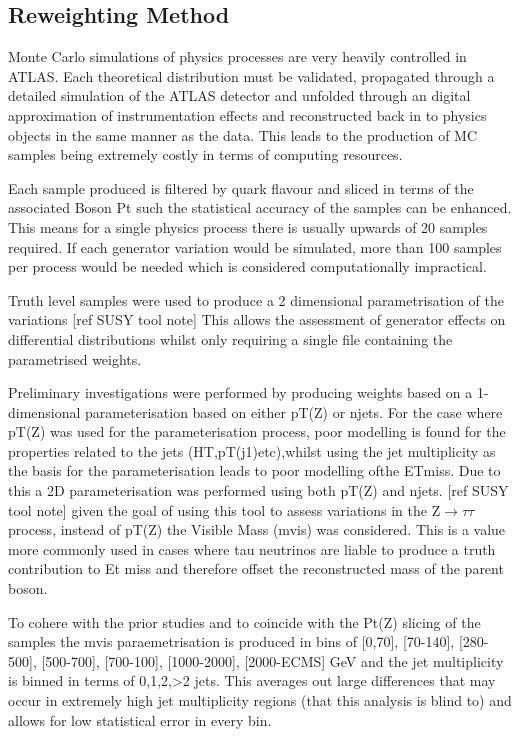 \subsection{Reweighting Method}

Monte Carlo simulations of physics processes are very heavily controlled in ATLAS. Each theoretical distribution must be validated, propagated through a detailed simulation of the ATLAS detector and unfolded through an digital approximation of instrumentation effects and reconstructed back in to physics objects in the same manner as the data. This leads to the production of MC samples being extremely costly in terms of computing resources.

Each sample produced is filtered by quark flavour and sliced in terms of the associated Boson Pt such the statistical accuracy of the samples can be enhanced. This means for a single physics process there is usually upwards of 20 samples required. If each generator variation would be simulated, more than 100 samples per process would be needed which is considered computationally impractical. 

Truth level samples were used to produce a 2 dimensional parametrisation of the variations [ref SUSY tool note] This allows the assessment of generator effects on differential distributions whilst only requiring a single file containing the parametrised weights. 

Preliminary investigations were performed by producing weights based on a 1-dimensional parameterisation  based  on  either pT(Z) or njets. For  the  case  where pT(Z)  was used  for  the  parameterisation process, poor modelling is found for the properties related to the jets (HT,pT(j1)etc),whilst using the jet multiplicity as the basis for the parameterisation leads to poor modelling ofthe ETmiss.  Due to this a 2D parameterisation was performed using both pT(Z) and njets. [ref SUSY tool note] given the goal of using this tool to assess variations in the Z$\rightarrow\tau\tau$ process, instead of pT(Z) the Visible Mass (mvis) was considered. This is a value more commonly used in cases where tau neutrinos are liable to produce a truth contribution to Et miss and therefore offset the reconstructed mass of the parent boson.

To cohere with the prior studies and to coincide with the Pt(Z) slicing of the samples the mvis paraemetrisation is produced in bins of [0,70], [70-140], [280-500], [500-700], [700-100], [1000-2000], [2000-ECMS] GeV and the jet multiplicity is binned in terms of 0,1,2,>2 jets. This averages out large differences that may occur in extremely high jet multiplicity regions (that this analysis is blind to) and allows for low statistical error in every bin.

